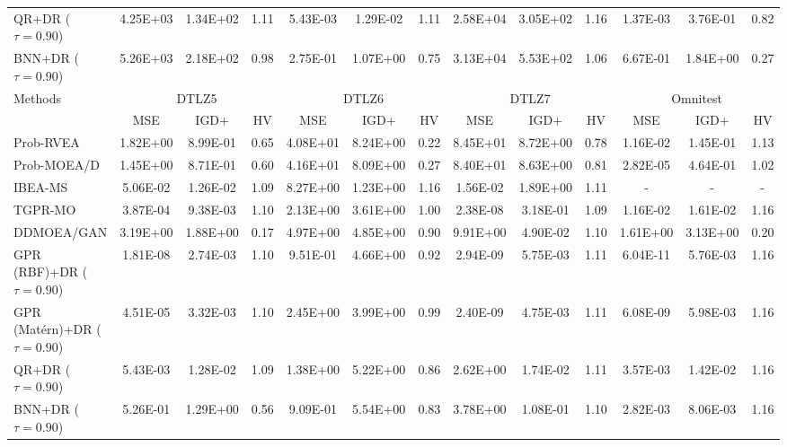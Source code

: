\documentclass{article}
\begin{document}
\begin{table}[!htbp]
{\begin{tabular}{l ccc ccc ccc ccc}
QR+DR ($\tau=0.90$)
& 4.25E+03 & 1.34E+02 & 1.11
& 5.43E-03 & 1.29E-02 & 1.11
& 2.58E+04 & 3.05E+02 & 1.16
& 1.37E-03 & 3.76E-01 & 0.82 \\

BNN+DR ($\tau=0.90$)
& 5.26E+03 & 2.18E+02 & 0.98
& 2.75E-01 & 1.07E+00 & 0.75
& 3.13E+04 & 5.53E+02 & 1.06
& 6.67E-01 & 1.84E+00 & 0.27 \\

\midrule
Methods 
& \multicolumn{3}{c}{DTLZ5} 
& \multicolumn{3}{c}{DTLZ6} 
& \multicolumn{3}{c}{DTLZ7} 
& \multicolumn{3}{c}{Omnitest} \\
\cmidrule(lr){2-4} \cmidrule(lr){5-7} \cmidrule(lr){8-10} \cmidrule(lr){11-13}
& MSE & IGD+ & HV
& MSE & IGD+ & HV
& MSE & IGD+ & HV
& MSE & IGD+ & HV \\
\midrule

Prob-RVEA
& 1.82E+00 & 8.99E-01 & 0.65
& 4.08E+01 & 8.24E+00 & 0.22
& 8.45E+01 & 8.72E+00 & 0.78
& 1.16E-02 & 1.45E-01 & 1.13 \\

Prob-MOEA/D
& 1.45E+00 & 8.71E-01 & 0.60
& 4.16E+01 & 8.09E+00 & 0.27
& 8.40E+01 & 8.63E+00 & 0.81
& 2.82E-05 & 4.64E-01 & 1.02 \\

IBEA-MS
& 5.06E-02  & 1.26E-02  & 1.09
& 8.27E+00  & 1.23E+00  & 1.16
& 1.56E-02  & 1.89E+00  & 1.11
& - & - & - \\

TGPR-MO
& 3.87E-04 & 9.38E-03 & 1.10
& 2.13E+00 & 3.61E+00 & 1.00
& 2.38E-08 & 3.18E-01 & 1.09
& 1.16E-02 & 1.61E-02 & 1.16 \\

DDMOEA/GAN
& 3.19E+00 & 1.88E+00 & 0.17
& 4.97E+00 & 4.85E+00 & 0.90
& 9.91E+00 & 4.90E-02 & 1.10
& 1.61E+00 & 3.13E+00 & 0.20 \\

GPR (RBF)+DR ($\tau=0.90$)
& 1.81E-08 & 2.74E-03 & 1.10
& 9.51E-01 & 4.66E+00 & 0.92
& 2.94E-09 & 5.75E-03 & 1.11
& 6.04E-11 & 5.76E-03 & 1.16 \\

GPR (Mat\'ern)+DR ($\tau=0.90$)
& 4.51E-05 & 3.32E-03 & 1.10
& 2.45E+00 & 3.99E+00 & 0.99
& 2.40E-09 & 4.75E-03 & 1.11
& 6.08E-09 & 5.98E-03 & 1.16 \\

QR+DR ($\tau=0.90$)
& 5.43E-03 & 1.28E-02 & 1.09
& 1.38E+00 & 5.22E+00 & 0.86
& 2.62E+00 & 1.74E-02 & 1.11
& 3.57E-03 & 1.42E-02 & 1.16 \\

BNN+DR ($\tau=0.90$)
& 5.26E-01 & 1.29E+00 & 0.56
& 9.09E-01 & 5.54E+00 & 0.83
& 3.78E+00 & 1.08E-01 & 1.10
& 2.82E-03 & 8.06E-03 & 1.16 \\

\bottomrule
\end{tabular}
}

\end{table}
\end{document}
